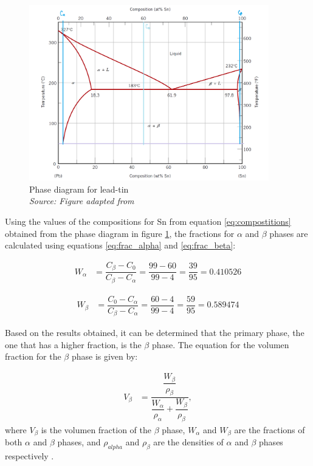 \begin{figure}[h]
    \centering
    \includegraphics[width=0.93\textwidth]{graficas/diagrama.png}
    \caption{Phase diagram for lead-tin \\
    \textit{Source: Figure adapted from \citep{callister2010materials}}}
    \label{fig:diagrama}
\end{figure}

Using the values of the compositions for Sn from equation \ref{eq:compostitions} obtained from the phase diagram in figure \ref{fig:diagrama}, the fractions for $\alpha$ and $\beta$ phases are calculated using equations \eqref{eq:frac_alpha} and \eqref{eq:frac_beta}:

\begin{align}
    \label{eq:w_alpha}
    W_{\alpha}&=\dfrac{C_{\beta}-C_0}{C_{\beta}-C_{\alpha}} =\dfrac{99-60}{99-4} = \dfrac{39}{95} = 0.410526
\end{align}

\begin{align}
    \label{eq:w_beta}
    W_{\beta}&=\dfrac{C_0-C_{\alpha}}{C_{\beta}-C_{\alpha}} =\dfrac{60-4}{99-4} =\dfrac{59}{95} =0.589474
\end{align}

Based on the results obtained, it can be determined that the primary phase, the one that has a higher fraction, is the $\beta$ phase. The equation for the volumen fraction for the $\beta$ phase is given by:

\begin{align}
    \label{eq:vol_beta}
    V_{\beta}&=\dfrac{\dfrac{W_{\beta}}{\rho_{\beta}}}{\dfrac{W_{\alpha}}{\rho_{\alpha}}+\dfrac{W_{\beta}}{\rho_{\beta}}},
\end{align}
where $V_{\beta}$ is the volumen fraction of the $\beta$ phase, $W_{\alpha}$ and $W_{\beta}$ are the fractions of both $\alpha$ and $\beta$ phases, and $\rho_{alpha}$ and $\rho_{\beta}$ are the densities of $\alpha$ and $\beta$ phases respectively \citep[p.~293]{callister2010materials}.

